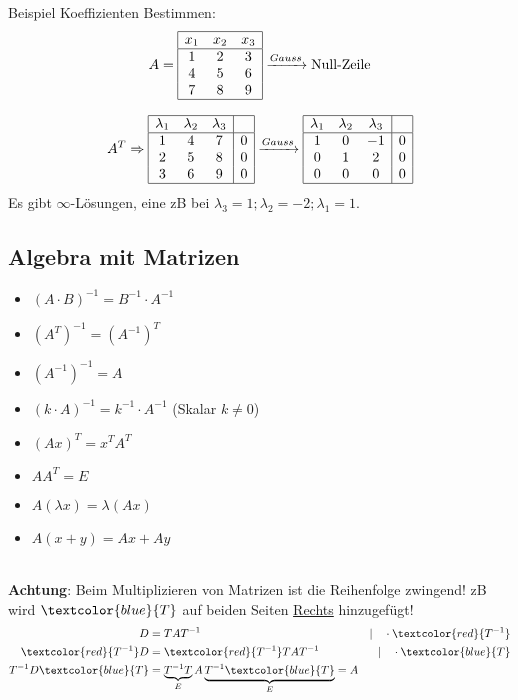 \noindent Beispiel Koeffizienten Bestimmen:
\[
A = \begin{array}{|ccc|}
	\hline
	x_1 & x_2 & x_3 \\
	\hline
	1 & 2 & 3 \\
	4 & 5 & 6 \\
	7 & 8 & 9 \\
	\hline
\end{array} \xrightarrow{Gauss} \text{Null-Zeile}
\]

\[
A^T \Rightarrow
	\begin{array}{|ccc|c|}
		\hline
		\lambda_1 & \lambda_2 & \lambda_3 & \\
		\hline
		1 & 4 & 7 & 0 \\
		2 & 5 & 8 & 0 \\
		3 & 6 & 9 & 0 \\
		\hline
	\end{array}
	\xrightarrow{Gauss}
	\begin{array}{|ccc|c|}
		\hline
		\lambda_1 & \lambda_2 & \lambda_3 & \\
		\hline
		1 & 0 & -1 & 0 \\
		0 & 1 & 2 & 0 \\
		0 & 0 & 0 & 0 \\
		\hline
	\end{array}
\]
Es gibt $\infty$-Lösungen, eine zB bei $\lambda_3 = 1; \lambda_2 = -2; \lambda_1 = 1$.

\subsection{Algebra mit Matrizen}
\begin{itemize}[nosep]
	\item $(A \cdot B)^{-1} = B^{-1} \cdot A^{-1}$
	\item $(A^T)^{-1} = (A^{-1})^T$
	\item $(A^{-1})^{-1} = A$
	\item $(k \cdot A)^{-1} = k^{-1} \cdot A^{-1}$ (Skalar $k \neq 0$)
	\item $(Ax)^T = x^TA^T$
	\item $AA^T = E$
	\item $A(\lambda x) = \lambda(Ax)$
	\item $A(x + y) = Ax + Ay$
\end{itemize}
~\\
\noindent\textbf{Achtung}: Beim Multiplizieren von Matrizen ist die Reihenfolge zwingend! zB wird $\textcolor{blue}{T}$ auf beiden Seiten \underline{Rechts} hinzugefügt!
\begin{align*}
	D &= TAT^{-1}  &| \quad \cdot \textcolor{red}{T^{-1}}\\
	\textcolor{red}{T^{-1}}D &= \textcolor{red}{T^{-1}}TAT^{-1}  &| \quad \cdot \textcolor{blue}{T}\\
	T^{-1}D\textcolor{blue}{T} &= \underbrace{T^{-1}T}_{E}A\underbrace{T^{-1}\textcolor{blue}{T}}_{E} = A
\end{align*}
